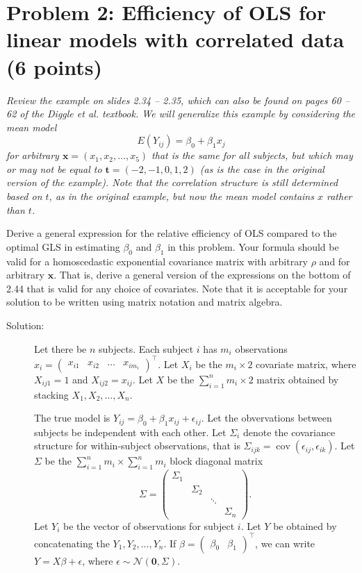 \documentclass[11pt, letterpaper]{article}
\newcommand{\bx}{{\bm x}}
\begin{document}
\section*{Problem 2: Efficiency of OLS for linear models with correlated data (6 points)}
{\em Review the example on slides 2.34 -- 2.35, which can also be found on pages 60 -- 62 of the Diggle et al. textbook.  We will generalize this example by considering the mean model
\[
E(Y_{ij}) = \beta_0 + \beta_1 x_j
\]
for arbitrary $\bx = (x_1,x_2,\ldots,x_5)$ that is the same for all subjects, but which may or may not
be equal to ${\bm t}=(-2,-1,0,1,2)$ (as is the case in the original version of the example).
Note that the correlation structure is still determined based on $t$, as in the original example, but now the mean model contains $x$ rather than $t$.}
\begin{enumerate}[(a)]
{\em \item Derive a general expression for the relative efficiency of OLS compared to the optimal GLS in estimating $\beta_0$ and $\beta_1$ in this problem.  Your formula should be valid for a homoscedastic exponential covariance matrix with arbitrary
$\rho$ and for arbitrary $\bx$.  That is, derive a general version of the expressions
on the bottom of 2.44 that is valid for any choice of covariates.  Note that it is acceptable for your solution to be written using matrix notation and matrix algebra.}

\begin{description}
\item[Solution:] Let there be $n$ subjects. Each subject $i$ has $m_i$
  observations
  $x_i = \begin{pmatrix} x_{i1} & 
    x_{i2} & \ldots & x_{im_i} \end{pmatrix}^\intercal$. Let $X_i$ be the
  $m_i \times 2$ covariate matrix, where $X_{ij1} = 1$ and $X_{ij2} =
  x_{ij}$. Let $X$ be the $\sum_{i=1}^n m_i \times 2$ matrix obtained by
  stacking $X_1,X_2,\ldots, X_n$.

  The true model is $Y_{ij} = \beta_0 + \beta_1x_{ij} + \epsilon_{ij}$. Let the
  obvervations between subjects be independent with each other. Let $\Sigma_i$
  denote the covariance structure for within-subject observations, that is
  $\Sigma_{ijk} = \operatorname{cov}\left(\epsilon_{ij}, \epsilon_{ik}\right)$.
  Let $\Sigma$ be the $\sum_{i=1}^n m_i \times \sum_{i=1}^n m_i$ block diagonal
  matrix
  \begin{equation}
    \Sigma =
    \begin{pmatrix}
      \Sigma_1 & & & \\
      & \Sigma_2 & & \\
      & & \ddots & \\
      & & & \Sigma_n
    \end{pmatrix}.
  \end{equation}
  Let $Y_i$ be the vector of observations for subject $i$. Let $Y$ be obtained
  by concatenating the $Y_1,Y_2,\ldots,Y_n$. If
  $\beta = \begin{pmatrix} \beta_0 & \beta_1 \end{pmatrix}^\intercal$, we can
  write $Y = X\beta + \epsilon$, where
  $\epsilon \sim \mathcal{N}\left(\mathbf{0}, \Sigma\right)$.
    

\end{description}
\end{enumerate}
\end{document}
